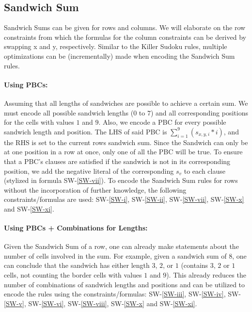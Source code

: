 \FloatBarrier
\newpage
\subsection{Sandwich Sum}
Sandwich Sums can be given for rows and columns. We will elaborate on the row constraints from which the formulas for the column constraints can be derived by swapping x and y, respectively. Similar to the Killer Sudoku rules, multiple optimizations can be (incrementally) made when encoding the Sandwich Sum rules.

\paragraph{Using PBCs:} Assuming that all lengths of sandwiches are possible to achieve a certain sum. We must encode all possible sandwich lengths ($0$ to $7$) and all corresponding positions for the cells with values $1$ and $9$. Also, we encode a PBC for every possible sandwich length and position. The LHS of said PBC is $\sum_{i=1}^{9} (s_{x,y,i}*i)$, and the RHS is set to the current rows sandwich sum. Since the Sandwich can only be at one position in a row at once, only one of all the PBC will be true. To ensure that a PBC's clauses are satisfied if the sandwich is not in its corresponding position, we add the negative literal of the corresponding $s_v$ to each clause (stylized in formula SW-\ref{SW-vii}). To encode the Sandwich Sum rules for rows without the incorporation of further knowledge, the following constraints/formulas are used: SW-\ref{SW-i}, SW-\ref{SW-ii}, SW-\ref{SW-vii}, SW-\ref{SW-x} and SW-\ref{SW-xi}.

\paragraph{Using PBCs + Combinations for Lengths:} Given the Sandwich Sum of a row, one can already make statements about the number of cells involved in the sum. For example, given a sandwich sum of $8$, one can conclude that the sandwich has either length $3$, $2$, or $1$ (contains $3$, $2$ or $1$ cells, not counting the border cells with values $1$ and $9$). This already reduces the number of combinations of sandwich lengths and positions and can be utilized to encode the rules using the constraints/formulas: SW-\ref{SW-iii}, SW-\ref{SW-iv}, SW-\ref{SW-v}, SW-\ref{SW-vi}, SW-\ref{SW-viii}, SW-\ref{SW-x} and SW-\ref{SW-xi}.

